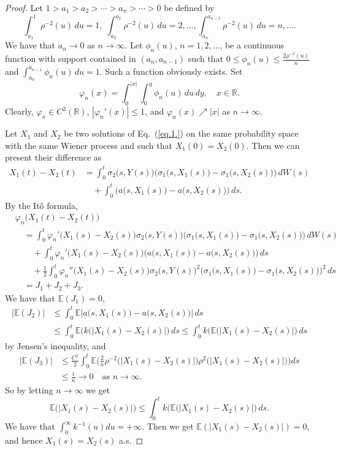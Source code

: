 \documentclass[numbers,compress,v1.0.1]{vmsta}
\theoremstyle{remark}
\newcommand{\E}{\mathbb E}
\newcommand*{\abs}[1]{\left\lvert#1\right\rvert}
\begin{document}
\begin{proof}
Let $1>a_1>a_2>\cdots>a_n>\cdots>0$ be defined by
%
\[
\int_{a_1}^1\rho^{-2}(u)\,du=1,\; \int
_{a_2}^{a_1}\rho^{-2}(u)\, du=2,\ldots,\int
_{a_n}^{a_{n-1}}\rho^{-2}(u)\,du=n,\ldots.
\]
%
We have that $a_n\rightarrow0$ as $n\rightarrow\infty$. Let $\phi
_n(u)$, $n=1,2,\ldots$, be a continuous function with support contained
in $(a_n,a_{n-1})$ such that $0\leq\phi_n(u) \leq\frac{ 2 \rho
^{-2}(u)}{n}$ and $\int_{a_n}^{a_{n-1}}\phi_n(u)\,du=1$. Such a
function obviously exists. Set
%
\[
\varphi_n(x)=\int_0^{\abs{x}}\int
_0^y \phi_n(u)\,du\,dy, \quad x\in {
\mathbb R}.
\]
%
Clearly, $\varphi_n\in C^2({\mathbb R})$, $\abs{\varphi_n'(x)} \leq1$,
and $\varphi_n(x)\nearrow\abs{x}$ as $n\rightarrow\infty$.

Let $X_1 $ and $X_2$ be two solutions of Eq.~(\ref{eq.1.}) on
the same probability space with the same Wiener process and such that
$X_1(0)=X_2(0) $. Then we can present their difference as
%
\begin{align*}
X_1(t)-X_2(t)&=\int_0^t
\sigma_2\bigl(s,Y(s)\bigr) \bigl(\sigma_1
\bigl(s,X_1(s)\bigr)-\sigma _1\bigl(s,X_2(s)
\bigr)\bigr)\,dW(s)
\\
&\quad+\int_0^t \bigl(a\bigl(s,X_1(s)
\bigr)-a\bigl(s,X_2(s)\bigr)\bigr)\,ds.
\end{align*}
%
By the It\^o formula,
%
\begin{align*}
&\varphi_n\bigl(X_1(t)-X_2(t)\bigr)
\\
&\quad=\int_0^t \varphi_n'
\bigl(X_1(s)-X_2(s)\bigr) \sigma_2
\bigl(s,Y(s)\bigr) \bigl(\sigma _1\bigl(s,X_1(s)\bigr)-
\sigma_1\bigl(s,X_2(s)\bigr)\bigr)\,dW(s)
\\
&\qquad+\int_0^t \varphi_n'
\bigl(X_1(s)-X_2(s)\bigr) \bigl(a\bigl(s,X_1(s)
\bigr)-a\bigl(s,X_2(s)\bigr)\bigr)\,ds
\\
&\qquad+\frac{1}{2} \int_0^t
\varphi_n''\bigl(X_1(s)-X_2(s)
\bigr) \sigma_2\bigl(s,Y(s)\bigr)^2\bigl(
\sigma_1\bigl(s,X_1(s)\bigr)-\sigma_1
\bigl(s,X_2(s)\bigr)\bigr)^2\,ds
\\
&\quad=J_1+J_2+J_3.
\end{align*}
%
We have that $\E(J_1)=0$,
%
\begin{align*}
\abs{\E(J_2)}&\leq\int_0^t\E
\abs{a\bigl(s,X_1(s)\bigr)-a\bigl(s,X_2(s)\bigr)}\,ds
\\
&\leq\int_0^t \E(k\bigl(\abs{X_1(s)-X_2(s)}
\bigr)\,ds \leq\int_0^t k(\E\bigl(
\abs{X_1(s)-X_2(s)}\bigr)\,ds
\end{align*}
%
by Jensen's inequality, and
%
\begin{align*}
\abs{\E(J_3)}&\leq\frac{C^2}{2}\int_0^t
\E \biggl(\frac{2}{n}\rho ^{-2}\bigl(\big|X_1(s)-X_2(s)\big|
\bigr)\rho^2\bigl(\big|X_1(s)-X_2(s)\big|\bigr)
\biggr)ds
\\
&\leq\frac{t}{n}\rightarrow0\quad\text{as }n\rightarrow\infty.
\end{align*}
%
So by letting $n\rightarrow\infty$ we get
%
\[
\E\bigl(\big|X_1(s)-X_2(s)\big|\bigr) \leq\int
_0^t k(\E\bigl(\big| X_1(s)-X_2(s)\big|
\bigr)\,ds.
\]
%
We have that $\int_0^\infty k^{-1}(u)du=+\infty$. Then we get $\E(\abs{
X_1(s)-X_2(s) })=0$, and hence $X_1(s)=X_2(s)$ a.s.
\end{proof}
\end{document}
